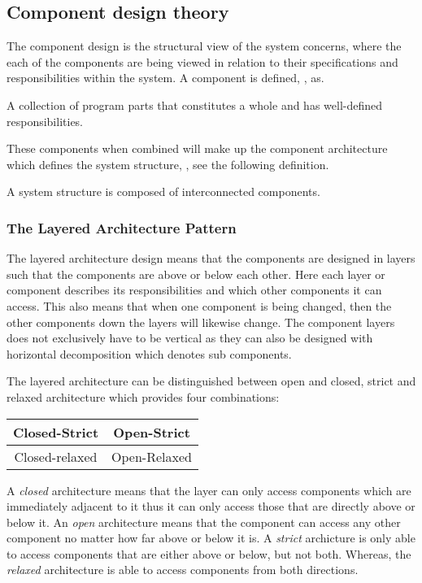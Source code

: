 \subsection{Component design theory} \label{sec:archicomponents}
The component design \cite{Rod-Aalborg} is the structural view of the system concerns, where the each of the components are being viewed in relation to their specifications and responsibilities within the system.
A component is defined, \citep[p.~192]{Rod-Aalborg}, as.
\begin{defn}\label{defn:component}
	A collection of program parts that constitutes a whole and has well-defined responsibilities.
\end{defn}

These components when combined will make up the component architecture which defines the system structure, \citep[p.~192]{Rod-Aalborg}, see the following definition.
\begin{defn}\label{defn:Structure}
	A system structure is composed of interconnected components.
\end{defn}

\subsubsection*{The Layered Architecture Pattern}

The layered architecture design means that the components are designed in layers such that the components are above or below each other.
Here each layer or component describes its responsibilities and which other components it can access.
This also means that when one component is being changed, then the other components down the layers will likewise change.
The component layers does not exclusively have to be vertical as they can also be designed with horizontal decomposition which denotes sub components.

The layered architecture can be distinguished between open and closed, strict and relaxed architecture which provides four combinations:

\begin{center}
	\begin{tabular}{| c | c |}
		\hline
		Closed-Strict & Open-Strict \\
		\hline
		Closed-relaxed & Open-Relaxed \\
		\hline
	\end{tabular}
\end{center}

A \textit{closed} architecture means that the layer can only access components which are immediately adjacent to it thus it can only access those that are directly above or below it.
An \textit{open} architecture means that the component can access any other component no matter how far above or below it is.
A \textit{strict} archicture is only able to access components that are either above or below, but not both.
Whereas, the \textit{relaxed} architecture is able to access components from both directions.

